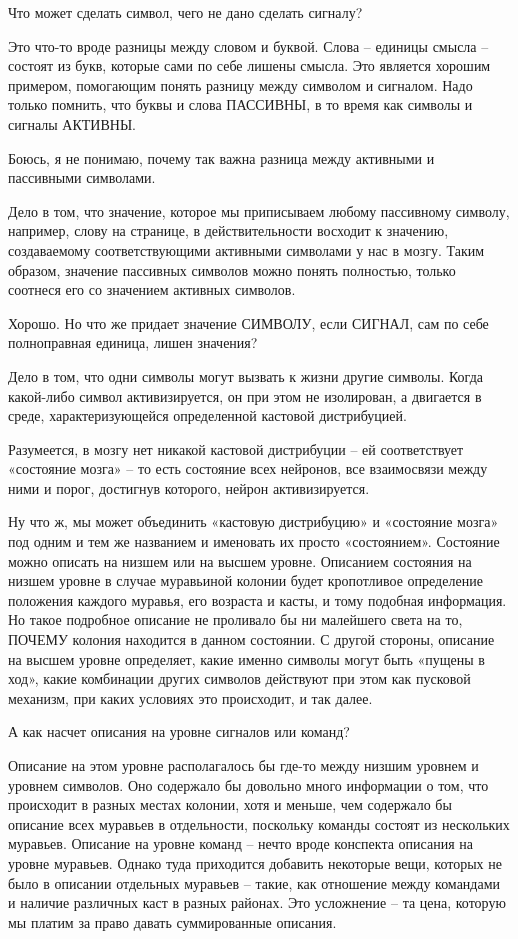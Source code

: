 \documentclass[../main.tex]{subfiles}
\begin{document}
\begin{dialogue}
 Что может сделать символ, чего не дано сделать сигналу?

 Это что-то вроде разницы между словом и буквой. Слова \--- единицы смысла \--- состоят из букв, которые сами по себе лишены смысла. Это является хорошим примером, помогающим понять разницу между символом и сигналом. Надо только помнить, что буквы и слова ПАССИВНЫ, в то время как символы и сигналы АКТИВНЫ.

 Боюсь, я не понимаю, почему так важна разница между активными и пассивными символами.

 Дело в том, что значение, которое мы приписываем любому пассивному символу, например, слову на странице, в действительности восходит к значению, создаваемому соответствующими активными символами у нас в мозгу. Таким образом, значение пассивных символов можно понять полностью, только соотнеся его со значением активных символов.

 Хорошо. Но что же придает значение СИМВОЛУ, если СИГНАЛ, сам по себе полноправная единица, лишен значения?

 Дело в том, что одни символы могут вызвать к жизни другие символы. Когда какой-либо символ активизируется, он при этом не изолирован, а двигается в среде, характеризующейся определенной кастовой дистрибуцией.

 Разумеется, в мозгу нет никакой кастовой дистрибуции \--- ей соответствует «состояние мозга» \--- то есть состояние всех нейронов, все взаимосвязи между ними и порог, достигнув которого, нейрон активизируется.

 Ну что ж, мы может объединить «кастовую дистрибуцию» и «состояние мозга» под одним и тем же названием и именовать их просто «состоянием». Состояние можно описать на низшем или на высшем уровне. Описанием состояния на низшем уровне в случае муравьиной колонии будет кропотливое определение положения каждого муравья, его возраста и касты, и тому подобная информация. Но такое подробное описание не проливало бы ни малейшего света на то, ПОЧЕМУ колония находится в данном состоянии. С другой стороны, описание на высшем уровне определяет, какие именно символы могут быть «пущены в ход», какие комбинации других символов действуют при этом как пусковой механизм, при каких условиях это происходит, и так далее.

 А как насчет описания на уровне сигналов или команд?

 Описание на этом уровне располагалось бы где-то между низшим уровнем и уровнем символов. Оно содержало бы довольно много информации о том, что происходит в разных местах колонии, хотя и меньше, чем содержало бы описание всех муравьев в отдельности, поскольку команды состоят из нескольких муравьев. Описание на уровне команд \--- нечто вроде конспекта описания на уровне муравьев. Однако туда приходится добавить некоторые вещи, которых не было в описании отдельных муравьев \--- такие, как отношение между командами и наличие различных каст в разных районах. Это усложнение \--- та цена, которую мы платим за право давать суммированные описания.


\end{dialogue}
\end{document}
